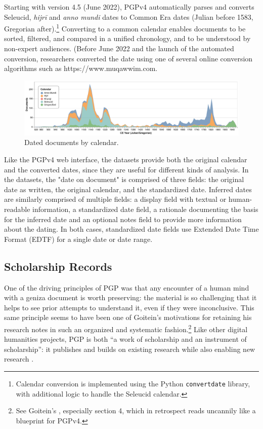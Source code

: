 \documentclass{article}
\begin{document}
Starting with version 4.5 (June 2022), PGPv4 automatically parses and converts Seleucid, \textit{hijrī} and \textit{anno mundi} dates to Common Era dates (Julian before 1583, Gregorian after).\footnote{Calendar conversion is implemented using the Python \texttt{convertdate} library, with additional logic to handle the Seleucid calendar.} Converting to a common calendar enables documents to be sorted, filtered, and compared in a unified chronology, and to be understood by non-expert audiences. (Before June 2022 and the launch of the automated conversion, researchers converted the date using one of several online conversion algorithms such as https://www.muqawwim.com. 

\begin{figure}[!hbt]
  \centering
  \includegraphics[width=\textwidth]{charts/dated_docs_by_cal.pdf}
  \caption{Dated documents by calendar.}
  \label{fig:docs_dating_combined}
\end{figure}

Like the PGPv4 web interface, the datasets provide both the original calendar and the converted dates, since they are useful for different kinds of analysis. In the datasets, the "date on document" is comprised of three fields: the original date as written, the original calendar, and the standardized date. Inferred dates are similarly comprised of multiple fields: a display field with textual or human-readable information, a standardized date field, a rationale documenting the basis for the inferred date and an optional notes field to provide more information about the dating. In both cases, standardized date fields use Extended Date Time Format (EDTF) for a single date or date range.

\subsection{Scholarship Records}

One of the driving principles of PGP was that any encounter of a human mind with a geniza document is worth preserving: the material is so challenging that it helps to see prior attempts to understand it, even if they were inconclusive. This same principle seems to have been one of Goitein's motivations for retaining his research notes in such an organized and systematic fashion.\footnote{See Goitein's , especially section 4, which in retrospect reads uncannily like a blueprint for PGPv4.} Like other digital humanities projects, PGP is both “a work of scholarship and an instrument of scholarship”: it publishes and builds on existing research while also enabling new research \autocite[2]{kotin_world_2024}.
\end{document}
